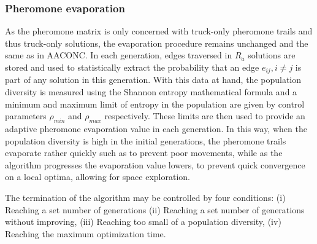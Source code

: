\documentclass{article}
\begin{document}
	\subsubsection{Pheromone evaporation}
	As the pheromone matrix is only concerned with truck-only pheromone trails and thus truck-only solutions, the evaporation procedure remains unchanged and the same as in AACONC. In each generation, edges traversed in $R_a$ solutions are stored and used to statistically extract the probability that an edge $e_{ij},i\neq j$ is part of any solution in this generation. With this data at hand, the population diversity is measured using the Shannon entropy mathematical formula and a minimum and maximum limit of entropy in the population are given by control parameters $\rho_{min}$ and $\rho_{max}$ respectively. These limits are then used to provide an adaptive pheromone evaporation value in each generation. In this way, when the population diversity is high in the initial generations, the pheromone trails evaporate rather quickly such as to prevent poor movements, while as the algorithm progresses the evaporation value lowers, to prevent quick convergence on a local optima, allowing for space exploration.
	\par 
	The termination of the algorithm may be controlled by four conditions: (i) Reaching a set number of generations (ii) Reaching a set number of generations without improving, (iii) Reaching too small of a population diversity, (iv) Reaching the maximum optimization time.
\end{document}
